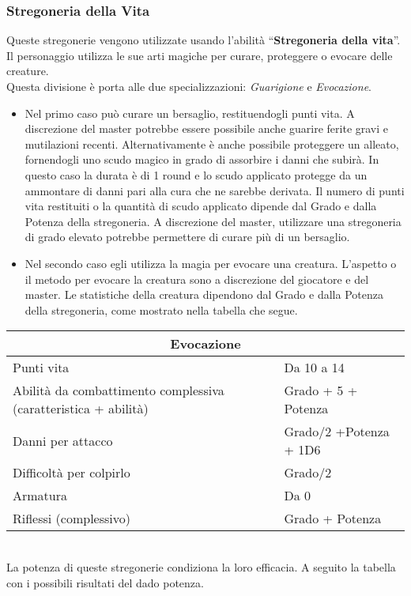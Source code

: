 \documentclass[../manuale_main.tex]{subfiles}
\begin{document}
\subsubsection{Stregoneria della Vita}
Queste stregonerie vengono utilizzate usando l'abilità ``\textbf{Stregoneria della vita}''.\\
Il personaggio utilizza le sue arti magiche per curare, proteggere o evocare delle creature. \\
Questa divisione è porta alle due specializzazioni: \emph{Guarigione} e \emph{Evocazione}.\\
\begin{itemize}
\item Nel primo caso può curare un bersaglio, restituendogli punti vita. A discrezione del master potrebbe essere possibile anche guarire ferite gravi e mutilazioni recenti. Alternativamente è anche possibile proteggere un alleato, fornendogli uno scudo magico in grado di assorbire i danni che subirà. In questo caso la durata è di 1 round e lo scudo applicato protegge da un ammontare di danni pari alla cura che ne sarebbe derivata. Il numero di punti vita restituiti o la quantità di scudo applicato dipende dal Grado e dalla Potenza della stregoneria. A discrezione del master, utilizzare una stregoneria di grado elevato potrebbe permettere di curare più di un bersaglio.
\item Nel secondo caso egli utilizza la magia per evocare una creatura. L'aspetto o il metodo per evocare la creatura sono a discrezione del giocatore e del master. Le statistiche della creatura dipendono dal Grado e dalla Potenza della stregoneria, come mostrato nella tabella che segue.
\end{itemize}

\begin{tabular}{| l | l |}
\hline
\multicolumn{2}{|c|}{\textbf{Evocazione}}\\
\hline
Punti vita&Da 10 a 14\\
Abilità da combattimento complessiva (caratteristica + abilità)&Grado + 5 + Potenza\\
Danni per attacco&Grado/2 +Potenza + 1D6\\
Difficoltà per colpirlo&Grado/2 \\
Armatura&Da 0\\
Riflessi (complessivo)& Grado + Potenza\\
\hline
\end{tabular}\\

La potenza di queste stregonerie condiziona la loro efficacia. A seguito la tabella con i possibili risultati del dado potenza.\\
\end{document}
